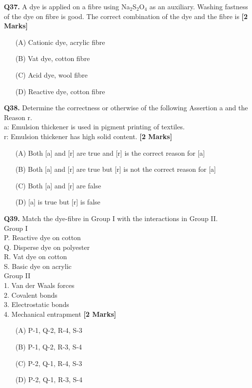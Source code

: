 \documentclass[11pt]{article}
\newcommand{\questionb}[2]{
    \noindent\textbf{Q#2.} #1 \hfill \textbf{[2 Marks]}
}
\begin{document}
\questionb{A dye is applied on a fibre using Na\(_2\)S\(_2\)O\(_4\) as an auxiliary. Washing fastness of the dye on fibre is good. The correct combination of the dye and the fibre is}{37}
\begin{enumerate}
    \item[(A)] Cationic dye, acrylic fibre
    \item[(B)] Vat dye, cotton fibre
    \item[(C)] Acid dye, wool fibre
    \item[(D)] Reactive dye, cotton fibre
\end{enumerate}
\vspace{0.5cm}

\questionb{Determine the correctness or otherwise of the following Assertion a and the Reason r. \\
a: Emulsion thickener is used in pigment printing of textiles. \\
r: Emulsion thickener has high solid content.}{38}
\begin{enumerate}
    \item[(A)] Both [a] and [r] are true and [r] is the correct reason for [a]
    \item[(B)] Both [a] and [r] are true but [r] is not the correct reason for [a]
    \item[(C)] Both [a] and [r] are false
    \item[(D)] [a] is true but [r] is false
\end{enumerate}
\vspace{0.5cm}

\questionb{Match the dye-fibre in Group I with the interactions in Group II. \\
Group I \\
P. Reactive dye on cotton \\
Q. Disperse dye on polyester \\
R. Vat dye on cotton \\
S. Basic dye on acrylic \\
Group II \\
1. Van der Waals forces \\
2. Covalent bonds \\
3. Electrostatic bonds \\
4. Mechanical entrapment}{39}
\begin{enumerate}
    \item[(A)] P-1, Q-2, R-4, S-3
    \item[(B)] P-1, Q-2, R-3, S-4
    \item[(C)] P-2, Q-1, R-4, S-3
    \item[(D)] P-2, Q-1, R-3, S-4
\end{enumerate}
\vspace{0.5cm}
\end{document}
